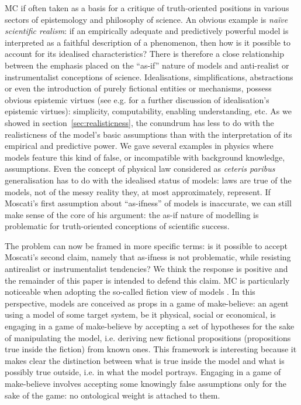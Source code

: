 \documentclass[a4paper,11pt]{article}
\theoremstyle{definition}
\begin{document}
MC if often taken as a basis for a critique of truth-oriented positions in various sectors of epistemology and philosophy of science. An obvious example is \textit{naïve scientific realism}: if an empirically adequate and predictively powerful model is interpreted as a faithful description of a phenomenon, then how is it possible to account for its idealised characteristics? There is therefore a close relationship between the emphasis placed on the ``as-if'' nature of models and anti-realist or instrumentalist conceptions of science. Idealisations, simplifications, abstractions or even the introduction of purely fictional entities or mechanisms, possess obvious epistemic virtues (see e.g. \citep{Sullivan2019, Lawler2019, Nawar2019, Pincock2021} for a further discussion of idealisation's epistemic virtues): simplicity, computability, enabling understanding, etc. As we showed in section~\ref{sec:realisticness}, the conundrum has less to do with the realisticness of the model's basic assumptions than with the interpretation of its empirical and predictive power. We gave several examples in physics where models feature this kind of false, or incompatible with background knowledge, assumptions. Even the concept of physical law considered as \textit{ceteris paribus} generalisation \citep{Cartwright1983} has to do with the idealised status of models: laws are true of the models, not of the messy reality they, at most approximately, represent. If Moscati's first assumption about ``as-ifness'' of models is inaccurate, we can still make sense of the core of his argument: the as-if nature of modelling is problematic for truth-oriented conceptions of scientific success.

The problem can now be framed in more specific terms: is it possible to accept Moscati's second claim, namely that as-ifness is not problematic, while resisting antirealist or instrumentalist tendencies? We think the response is positive and the remainder of this paper is intended to defend this claim. MC is particularly noticeable when adopting the so-called fiction view of models \citep{Frigg2016, Frigg2020, Toon2012}. In this perspective, models are conceived as props in a game of make-believe: an agent using a model of some target system, be it physical, social or economical, is engaging in a game of make-believe by accepting a set of hypotheses for the sake of manipulating the model, i.e. deriving new fictional propositions (propositions true inside the fiction) from known ones. This framework is interesting because it makes clear the distinction between what is true inside the model and what is possibly true outside, i.e. in what the model portrays. Engaging in a game of make-believe involves accepting some knowingly false assumptions only for the sake of the game: no ontological weight is attached to them.
\end{document}
